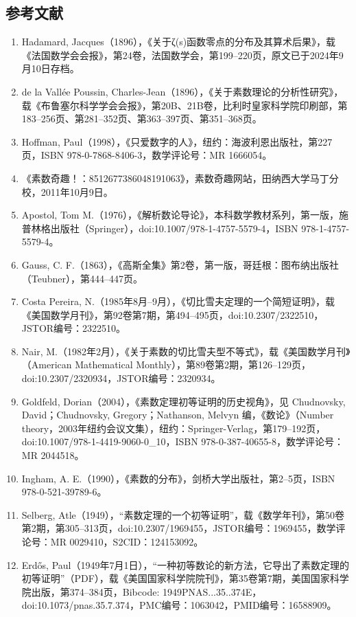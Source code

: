 \subsection{参考文献}
\begin{enumerate}
\item Hadamard, Jacques（1896），《关于ζ(s)函数零点的分布及其算术后果》，载《法国数学会会报》，第24卷，法国数学会，第199–220页，原文已于2024年9月10日存档。
\item de la Vallée Poussin, Charles-Jean（1896），《关于素数理论的分析性研究》，载《布鲁塞尔科学学会会报》，第20B、21B卷，比利时皇家科学院印刷部，第183–256页、第281–352页、第363–397页、第351–368页。
\item Hoffman, Paul（1998），《只爱数字的人》，纽约：海波利恩出版社，第227页，ISBN 978-0-7868-8406-3，数学评论号：MR 1666054。
\item 《素数奇趣！：8512677386048191063》，素数奇趣网站，田纳西大学马丁分校，2011年10月9日。
\item Apostol, Tom M.（1976），《解析数论导论》，本科数学教材系列，第一版，施普林格出版社（Springer），doi:10.1007/978-1-4757-5579-4，ISBN 978-1-4757-5579-4。
\item Gauss, C. F.（1863），《高斯全集》第2卷，第一版，哥廷根：图布纳出版社（Teubner），第444–447页。
\item Costa Pereira, N.（1985年8月–9月），《切比雪夫定理的一个简短证明》，载《美国数学月刊》，第92卷第7期，第494–495页，doi:10.2307/2322510，JSTOR编号：2322510。
\item Nair, M.（1982年2月），《关于素数的切比雪夫型不等式》，载《美国数学月刊》（American Mathematical Monthly），第89卷第2期，第126–129页，doi:10.2307/2320934，JSTOR编号：2320934。
\item Goldfeld, Dorian（2004），《素数定理初等证明的历史视角》，见 Chudnovsky, David；Chudnovsky, Gregory；Nathanson, Melvyn 编，《数论》（Number theory，2003年纽约会议文集），纽约：Springer-Verlag，第179–192页，doi:10.1007/978-1-4419-9060-0\_10，ISBN 978-0-387-40655-8，数学评论号：MR 2044518。
\item Ingham, A. E.（1990），《素数的分布》，剑桥大学出版社，第2–5页，ISBN 978-0-521-39789-6。
\item Selberg, Atle（1949），“素数定理的一个初等证明”，载《数学年刊》，第50卷第2期，第305–313页，doi:10.2307/1969455，JSTOR编号：1969455，数学评论号：MR 0029410，S2CID：124153092。
\item Erdős, Paul（1949年7月1日），“一种初等数论的新方法，它导出了素数定理的初等证明”（PDF），载《美国国家科学院院刊》，第35卷第7期，美国国家科学院出版，第374–384页，Bibcode: 1949PNAS...35..374E，doi:10.1073/pnas.35.7.374，PMC编号：1063042，PMID编号：16588909。

\end{enumerate}
